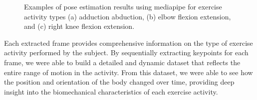 \begin{figure}[h!]
	\caption{Examples of pose estimation results using mediapipe for exercise activity types (a) adduction abduction, (b) elbow flexion extension, and (c) right knee flexion extension.}
	\label{fig:KeypointViz}
\end{figure}

Each extracted frame provides comprehensive information on the type of exercise activity performed by the subject. By sequentially extracting keypoints for each frame, we were able to build a detailed and dynamic dataset that reflects the entire range of motion in the activity. From this dataset, we were able to see how the position and orientation of the body changed over time, providing deep insight into the biomechanical characteristics of each exercise activity.

